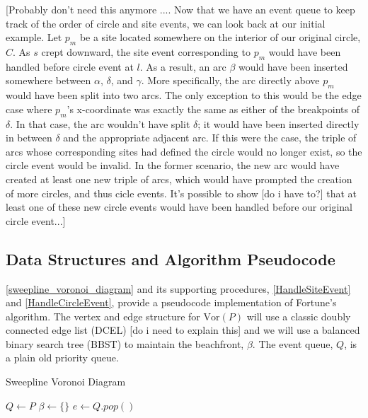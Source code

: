 \documentclass[12pt,twoside]{reedthesis}
\begin{document}
    [Probably don't need this anymore .... Now that we have an event queue to keep track of the order of circle and site events, we can look back at our initial example. Let $p_{m}$ be a site located somewhere on the interior of our original circle, $C$. As $s$ crept downward, the site event corresponding to $p_{m}$ would have been handled before circle event at $l$. As a result, an arc $\beta$ would have been inserted somewhere between $\alpha$, $\delta$, and $\gamma$. More specifically, the arc directly above $p_{m}$ would have been split into two arcs. The only exception to this would be the edge case where $p_{m}$'s x-coordinate was exactly the same as either of the breakpoints of $\delta$. In that case, the arc wouldn't have split $\delta$; it would have been inserted directly in between $\delta$ and the appropriate adjacent arc. If this were the case, the triple of arcs whose corresponding sites had defined the circle would no longer exist, so the circle event would be invalid. In the former scenario, the new arc would have created at least one new triple of arcs, which would have prompted the creation of more circles, and thus cicle events. It's possible to show [do i have to?] that at least one of these new circle events would have been handled before our original circle event...]

  \subsection{Data Structures and Algorithm Pseudocode} %
  \label{sub:sweep_algorithm_pseudocode}
    \cref{sweepline_voronoi_diagram} and its supporting procedures, \cref{HandleSiteEvent} and \cref{HandleCircleEvent}, provide a pseudocode implementation of Fortune's algorithm. The vertex and edge structure for $\mbox{Vor}(P)$ will use a classic doubly connected edge list (DCEL) [do i need to explain this] and we will use a balanced binary search tree (BBST) to maintain the beachfront, $\beta$. The event queue, $Q$, is a plain old priority queue.  
    
    \begin{algorithm}[H]
    \begin{algorithmic}[1]
    \caption{Sweepline Voronoi Diagram}\label{sweepline_voronoi_diagram}
    \State $Q\gets P$
    \State $\beta\gets \{\}$
      \State $e\gets Q.pop()$
      \State{}
      \Else
      \State{}
      \EndIf
    \EndWhile
    \EndProcedure
    \end{algorithmic} 
    \end{algorithm}
\end{document}
